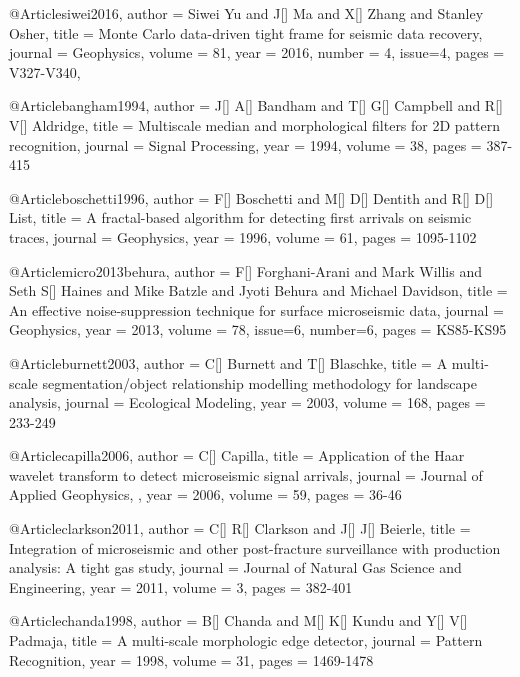 @Article{siwei2016,
  author =	 { Siwei Yu and J[] Ma and X[] Zhang and Stanley Osher},
  title =	 { Monte Carlo data-driven tight frame for seismic data recovery},
  journal =	 {Geophysics},
  volume =	 81,
  year =	 2016,
  number =	 4,
  issue=4,
  pages =	 {V327-V340},
}




@Article{bangham1994,
  author = 	 {J[] A[] Bandham and T[] G[] Campbell and R[] V[] Aldridge},
  title = 	 {Multiscale median and morphological filters for 2{D} pattern recognition},
  journal = 	 { Signal Processing},
  year = 	 1994,
  volume = 	 38,
  pages = 	 {387-415}}
  
  @Article{boschetti1996,
  author = 	 {F[] Boschetti and M[] D[] Dentith and R[] D[] List},
  title = 	 {A fractal-based algorithm for detecting first arrivals on seismic traces},
  journal = 	 {Geophysics},
  year = 	 1996,
  volume = 	 61,
  pages = 	 {1095-1102}}

  @Article{micro2013behura,
  author = 	 {F[] Forghani-Arani and Mark Willis and Seth S[] Haines and Mike Batzle and Jyoti Behura and Michael Davidson},
  title = 	 {An effective noise-suppression technique for surface microseismic data},
  journal = 	 {Geophysics},
  year = 	 2013,
  volume = 	 78,
  issue=6,
  number=6,
  pages = 	 {KS85-KS95}}
    
  
  @Article{burnett2003,
  author = 	 {C[] Burnett and T[] Blaschke},
  title = 	 {A multi-scale segmentation/object relationship modelling methodology for landscape analysis},
  journal = 	 {Ecological Modeling},
  year = 	 2003,
  volume = 	 168,
  pages = 	 {233-249}}
  
   @Article{capilla2006,
  author = 	 {C[] Capilla},
  title = 	 {Application of the Haar wavelet transform to detect microseismic signal arrivals},
  journal = 	 {Journal of Applied Geophysics,
},
  year = 	 2006,
  volume = 	 59,
  pages = 	 {36-46}}
  
    @Article{clarkson2011,
  author = 	 {C[] R[] Clarkson and J[] J[] Beierle},
  title = 	 {Integration of microseismic and other post-fracture surveillance
with production analysis: A tight gas study},
  journal = 	 {Journal of Natural Gas Science and Engineering},
  year = 	 2011,
  volume = 	 3,
  pages = 	 {382-401}} 
  
    @Article{chanda1998,
  author = 	 {B[] Chanda and M[] K[] Kundu and Y[] V[] Padmaja},
  title = 	 {A multi-scale morphologic edge detector},
  journal = 	 {Pattern Recognition},
  year = 	 1998,
  volume = 	 31,
  pages = 	 {1469-1478}} 
  
